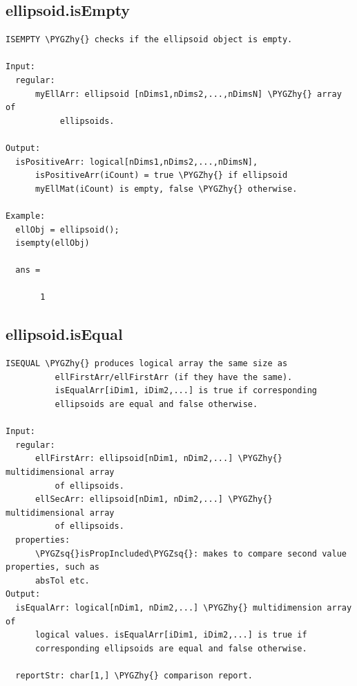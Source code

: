\documentclass[letterpaper,10pt,english]{sphinxmanual}
\def\PYGZhy{\char`\-}
\def\PYGZsq{\char`\'}
\begin{document}
\subsection{ellipsoid.isEmpty}
\label{chap_functions:ellipsoid-isempty}
\begin{Verbatim}[commandchars=\\\{\}]
ISEMPTY \PYGZhy{} checks if the ellipsoid object is empty.

Input:
  regular:
      myEllArr: ellipsoid [nDims1,nDims2,...,nDimsN] \PYGZhy{} array of
           ellipsoids.

Output:
  isPositiveArr: logical[nDims1,nDims2,...,nDimsN],
      isPositiveArr(iCount) = true \PYGZhy{} if ellipsoid
      myEllMat(iCount) is empty, false \PYGZhy{} otherwise.

Example:
  ellObj = ellipsoid();
  isempty(ellObj)

  ans =

       1
\end{Verbatim}


\subsection{ellipsoid.isEqual}
\label{chap_functions:ellipsoid-isequal}
\begin{Verbatim}[commandchars=\\\{\}]
ISEQUAL \PYGZhy{} produces logical array the same size as
          ellFirstArr/ellFirstArr (if they have the same).
          isEqualArr[iDim1, iDim2,...] is true if corresponding
          ellipsoids are equal and false otherwise.

Input:
  regular:
      ellFirstArr: ellipsoid[nDim1, nDim2,...] \PYGZhy{} multidimensional array
          of ellipsoids.
      ellSecArr: ellipsoid[nDim1, nDim2,...] \PYGZhy{} multidimensional array
          of ellipsoids.
  properties:
      \PYGZsq{}isPropIncluded\PYGZsq{}: makes to compare second value properties, such as
      absTol etc.
Output:
  isEqualArr: logical[nDim1, nDim2,...] \PYGZhy{} multidimension array of
      logical values. isEqualArr[iDim1, iDim2,...] is true if
      corresponding ellipsoids are equal and false otherwise.

  reportStr: char[1,] \PYGZhy{} comparison report.
\end{Verbatim}
\end{document}
